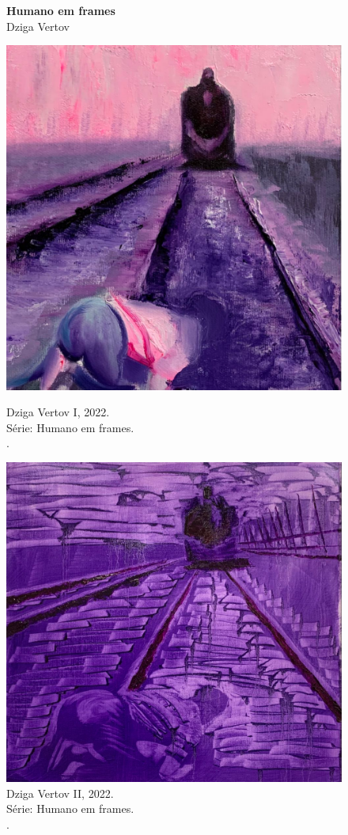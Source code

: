 \begin{figure}[t]
  \caption[Humano em frames: Dziga Vertov]{\textbf{Humano em frames} \\ Dziga Vertov}
  \begin{minipage}[t]{.45\linewidth}
	\includegraphics[width = .7\linewidth]{apendice/pinturas-finalizadas/boudet-dziga-vertov-i.pdf}
  \caption*{Dziga Vertov I, 2022. \\ Série: Humano em frames. \\ \oleo. \\ }
\end{minipage}
\begin{minipage}[t]{.45\linewidth}
	\includegraphics[width = \linewidth]{apendice/pinturas-finalizadas/boudet-dziga-vertov-ii.pdf}
  \caption*{Dziga Vertov II, 2022. \\ Série: Humano em frames. \\ \oleolinho. \\ }
\end{minipage}
\end{figure}

